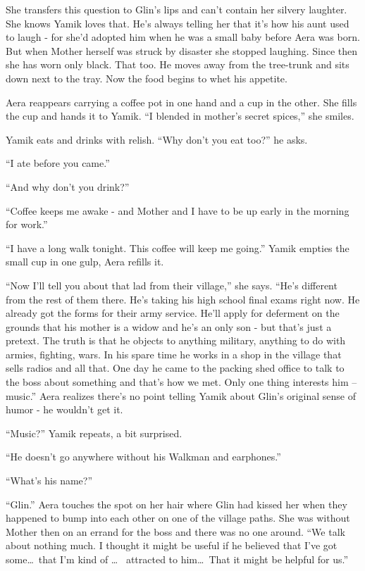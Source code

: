 \documentclass[twoside,11pt]{book}
\begin{document}
She transfers this question to Glin's lips and can't contain her silvery laughter. She knows Yamik loves that. He's
always telling her that it's how his aunt used to laugh - for she'd adopted him when he was a small baby before Aera
was born. But when Mother herself was struck by disaster she stopped laughing. Since then she has worn only black. That
too. He moves away from the tree-trunk and sits down next to the tray. Now the food begins to whet his appetite.

Aera reappears carrying a coffee pot in one hand and a cup in the other. She fills the cup and hands it to Yamik. ``I
blended in mother's secret spices,'' she smiles.

Yamik eats and drinks with relish. ``Why don't you eat too?'' he asks.

``I ate before you came.''

``And why don't you drink?''

``Coffee keeps me awake - and Mother and I have to be up early in the morning for work.''

``I have a long walk tonight. This coffee will keep me going.'' Yamik empties the small cup in one gulp, Aera refills
it.

``Now I'll tell you about that lad from their village,'' she says. ``He's different from the rest of them there. He's
taking his high school final exams right now. He already got the forms for their army service. He'll apply for
deferment on the grounds that his mother is a widow and he's an only son - but that's just a pretext. The truth is that
he objects to anything military, anything to do with armies, fighting, wars. In his spare time
%
he works in a shop in the village that sells radios and all that. One day he came to the packing shed office to talk to
the boss about something and that's how we met. Only one thing interests him -- music.'' Aera realizes there's no point
telling Yamik about Glin's original sense of humor - he wouldn't get it.

``Music?'' Yamik repeats, a bit surprised.

``He doesn't go anywhere without his Walkman and earphones.''

``What's his name?''

``Glin.'' Aera touches the spot on her hair where Glin had kissed her when they happened to bump into each other on
one of the village paths. She was without Mother then on an errand for the boss and there was no one around. ``We talk
about nothing much. I thought it might be useful if he believed that I've got some\dots\ that I'm kind of \dots\ %
attracted to him\dots\ That it might be helpful for us.''
\end{document}
